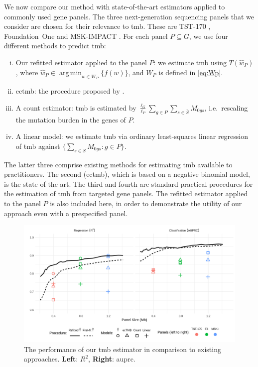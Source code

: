 \documentclass[12pt]{article}
\DeclareMathOperator*{\argmin}{arg\,min}
\begin{document}
We now compare our method with state-of-the-art estimators applied to commonly used gene panels. The three next-generation sequencing panels that we consider are chosen for their relevance to \gls{tmb}. These are TST-170 \citep{heydt_evaluation_2018}, Foundation~One \citep{frampton_development_2013} and MSK-IMPACT \citep{cheng_memorial_2015}.
For each panel $P \subseteq G$, we use four different methods to predict \gls{tmb}:
\begin{enumerate}[(i)]
 \item Our refitted estimator applied to the panel $P$: we estimate \gls{tmb} using $T(\hat{w}_P)$, where $\hat{w}_P \in \argmin_{w \in W_P} \{f(w)\}$, and $W_P$ is defined in \eqref{eq:Wp}. 
 \item \gls{ectmb}: the procedure proposed by \citet{yao_ectmb_2020}.
 \item A count estimator: \gls{tmb} is estimated by $\frac{\ell_G}{\ell_P} \sum_{g \in P} \sum_{s \in \bar{S}}M_{0gs}$, i.e.~rescaling the mutation burden in the genes of $P$. 
 \item A linear model: we estimate \gls{tmb} via ordinary least-squares linear regression of \gls{tmb} against $\bigl\{\sum_{s\in S} M_{0gs}: g \in P \bigr\}$.
\end{enumerate}
The latter three comprise existing methods for estimating \gls{tmb} available to practitioners. The second (\gls{ectmb}), which is based on a negative binomial model, is the state-of-the-art. The third and fourth are standard practical procedures for the estimation of \gls{tmb} from targeted gene panels. The refitted estimator applied to the panel $P$ is also included here, in order to demonstrate the utility of our approach even with a prespecified panel.

\begin{figure}[htbp]
\centering
\includegraphics[width=6in]{figures/fig7.png}
\vspace*{-5mm}
\caption{The performance of our \gls{tmb} estimator in comparison to existing approaches. \textbf{Left}: $R^2$, \textbf{Right}: \gls{auprc}. \label{fig:commercial_comparison}}
\vspace*{-2mm}
\end{figure}
\end{document}
